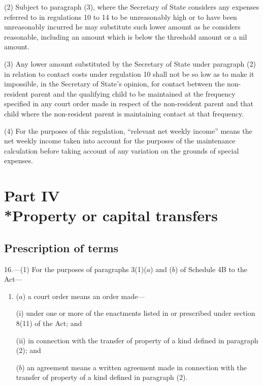 \documentclass[12pt,a4paper]{article}
\begin{document}
(2) Subject to paragraph (3), where the Secretary of State considers any expenses referred to in regulations 10 to 14 to be unreasonably high or to have been unreasonably incurred he may substitute such lower amount as he considers reasonable, including an amount which is below the threshold amount or a nil amount.

(3) Any lower amount substituted by the Secretary of State under paragraph (2) in relation to contact costs under regulation 10 shall not be so low as to make it impossible, in the Secretary of State’s opinion, for contact between the non-resident parent and the qualifying child to be maintained at the frequency specified in any court order made in respect of the non-resident parent and that child where the non-resident parent is maintaining contact at that frequency.

(4) For the purposes of this regulation, “relevant net weekly income” means the net weekly income taken into account for the purposes of the maintenance calculation before taking account of any variation on the grounds of special expenses.

\section[Part IV --- Property or capital transfers]{Part IV\\*Property or capital transfers}

\renewcommand\parthead{--- Part IV}

\subsection[16. Prescription of terms]{Prescription of terms}

16.---(1)  For the purposes of paragraphs 3(1)($a$)  and ($b$)  of Schedule 4B to the Act—
\begin{enumerate}\item[]
($a$) a court order means an order made—

(i) under one or more of the enactments listed in or prescribed under section 8(11) of the Act; and

(ii) in connection with the transfer of property of a kind defined in paragraph (2); and

($b$) an agreement means a written agreement made in connection with the transfer of property of a kind defined in paragraph (2).
\end{enumerate}
\end{document}
